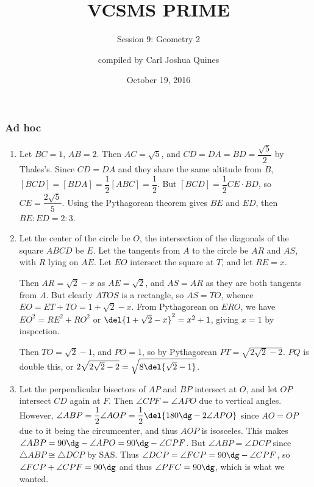 \documentclass[10pt,paper=letter]{scrartcl}
\begin{document}
\title{VCSMS PRIME}
\subtitle{Session 9: Geometry 2}
\author{compiled by Carl Joshua Quines}
\date{October 19, 2016}

\maketitle

\subsubsection*{Ad hoc}

\begin{enumerate}

\item Let $BC = 1$, $AB = 2$. Then $AC = \sqrt5$, and $CD = DA = BD = \dfrac{\sqrt5}2$ by Thales's. Since $CD = DA$ and they share the same altitude from $B$, $[BCD] = [BDA] = \dfrac12[ABC] = \dfrac12$. But $[BCD] = \dfrac12CE\cdot BD$, so $CE = \dfrac{2\sqrt5}5$. Using the Pythagorean theorem gives $BE$ and $ED$, then $BE : ED = 2 : 3$.

\item Let the center of the circle be $O$, the intersection of the diagonals of the square $ABCD$ be $E$. Let the tangents from $A$ to the circle be $AR$ and $AS$, with $R$ lying on $AE$. Let $EO$ intersect the square at $T$, and let $RE = x$.

Then $AR = \sqrt2 - x$ as $AE = \sqrt2$, and $AS = AR$ as they are both tangents from $A$. But clearly $ATOS$ is a rectangle, so $AS = TO$, whence $EO = ET + TO = 1 + \sqrt2 - x$. From Pythagorean on $ERO$, we have $EO^2 = RE^2 + RO^2$ or $\del{1 + \sqrt2 - x}^2 = x^2 + 1$, giving $x = 1$ by inspection.

Then $TO = \sqrt2 - 1$, and $PO = 1$, so by Pythagorean $PT = \sqrt{2\sqrt2 - 2}$. $PQ$ is double this, or $2\sqrt{2\sqrt2 - 2} = \sqrt{8\del{\sqrt2 - 1}}$.

\item Let the perpendicular bisectors of $AP$ and $BP$ intersect at $O$, and let $OP$ intersect $CD$ again at $F$. Then $\angle CPF = \angle APO$ due to vertical angles. However, $\angle ABP = \dfrac12\angle AOP = \dfrac12\del{180\dg - 2\angle APO}$ since $AO = OP$ due to it being the circumcenter, and thus $AOP$ is isosceles. This makes $\angle ABP = 90\dg - \angle APO = 90\dg - \angle CPF$. But $\angle ABP = \angle DCP$ since $\triangle ABP \cong \triangle DCP$ by SAS. Thus $\angle DCP = \angle FCP = 90\dg - \angle CPF$, so $\angle FCP + \angle CPF = 90\dg$ and thus $\angle PFC = 90\dg$, which is what we wanted.


\end{enumerate}
\end{document}
